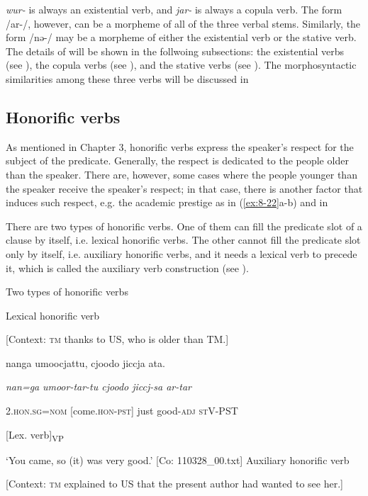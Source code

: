 \textit{wur-} is always an existential verb, and \textit{jar-} is always a copula verb. The form /ar-/, however, can be a morpheme of all of the three verbal stems. Similarly, the form /nə-/ may be a morpheme of either the existential verb or the stative verb. The details of  will be shown in the follwoing subsections: the existential verbs (see ), the copula verbs (see ), and the stative verbs (see ). The morphosyntactic similarities among these three verbs will be discussed in 

\subsection{Honorific verbs}

As mentioned in Chapter 3, honorific verbs express the speaker’s respect for the subject of the predicate. Generally, the respect is dedicated to the people older than the speaker. There are, however, some cases where the people younger than the speaker receive the speaker’s respect; in that case, there is another factor that induces such respect, e.g. the academic prestige as in (\ref{ex:8-22}a-b) and  in 

There are two types of honorific verbs. One of them can fill the predicate slot of a clause by itself, i.e. lexical honorific verbs. The other cannot fill the predicate slot only by itself, i.e. auxiliary honorific verbs, and it needs a lexical verb to precede it, which is called the auxiliary verb construction (see ).

\ea\label{ex:8-21}
  Two types of honorific verbs

\ea Lexical honorific verb

    [Context: \textsc{tm} thanks to US, who is older than TM.]

    {\TM}
\glll  nanga  umoocjattu,  {\textbar}cjoodo{\textbar}  jiccja  ata.

      \textit{nan=ga}  \textit{umoor{}-tar-tu  cjoodo  jiccj-sa  ar-tar}

      2.\textsc{hon}.\textsc{sg}=\textsc{nom}  [come.\textsc{hon}-\textsc{pst}]  just  good-\textsc{adj}  \textsc{st}V-PST

        [Lex. verb]\textsubscript{VP}      

\glt ‘You came, so (it) was very good.’ [Co: 110328\_00.txt]
\ex Auxiliary honorific verb

    [Context: \textsc{tm} explained to US that the present author had wanted to see her.]


